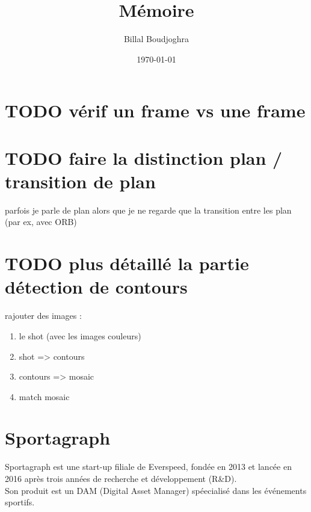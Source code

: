 \documentclass[11pt]{article}
\author{Billal Boudjoghra}
\date{\today}
\title{Mémoire}
\begin{document}
\maketitle
\tableofcontents

\newpage
\section{{\bfseries\sffamily TODO} vérif un frame vs une frame}
\label{sec:org5dc6520}
\section{{\bfseries\sffamily TODO} faire la distinction plan / transition de plan}
\label{sec:org22780aa}
parfois je parle de plan alors que je ne regarde que la transition entre les plan (par ex, avec ORB)\\
\section{{\bfseries\sffamily TODO} plus détaillé la partie détection de contours}
\label{sec:org2a6112f}
rajouter des images :\\
\begin{enumerate}
\item le shot (avec les images couleurs)\\
\item shot => contours\\
\item contours => mosaic\\
\item match mosaic\\
\end{enumerate}
\section{Sportagraph}
\label{sec:org379178a}
Sportagraph est une start-up filiale de Everspeed, fondée en 2013 et lancée en 2016 après trois années de recherche et développement (R\&D).\\
Son produit est un DAM (Digital Asset Manager) spéecialisé dans les événements sportifs.\\
\end{document}

